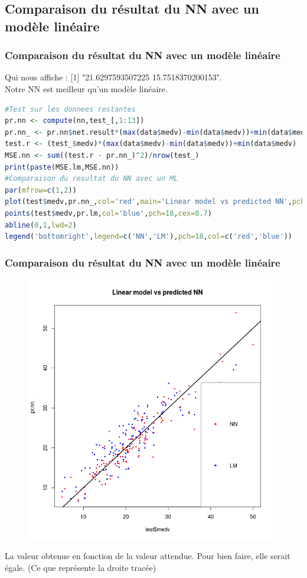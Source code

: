 \documentclass[compress]{beamer}
\begin{document}
\subsection{Comparaison du résultat du NN avec un modèle linéaire}
\begin{frame}[fragile]
	\frametitle{Comparaison du résultat du NN avec un modèle linéaire}
Qui nous affiche : [1] "21.6297593507225 15.7518370200153".\\
Notre NN est meilleur qu'un modèle linéaire.
\begin{lstlisting}[language=R]
#Test sur les donnees restantes
pr.nn <- compute(nn,test_[,1:13])
pr.nn_ <- pr.nn$net.result*(max(data$medv)-min(data$medv))+min(data$medv)
test.r <- (test_$medv)*(max(data$medv)-min(data$medv))+min(data$medv)
MSE.nn <- sum((test.r - pr.nn_)^2)/nrow(test_)
print(paste(MSE.lm,MSE.nn)) 
#Comparaison du resultat du NN avec un ML
par(mfrow=c(1,2))
plot(test$medv,pr.nn_,col='red',main='Linear model vs predicted NN',pch=18,cex=0.7)
points(test$medv,pr.lm,col='blue',pch=18,cex=0.7)
abline(0,1,lwd=2)
legend('bottomright',legend=c('NN','LM'),pch=18,col=c('red','blue'))
	\end{lstlisting}
\end{frame}


\begin{frame}
	\frametitle{Comparaison du résultat du NN avec un modèle linéaire}
		\begin{figure}
			\vspace{-7em}
			\includegraphics[width=\linewidth]{img/nn_lm}
		\end{figure}
		La valeur obtenue en fonction de la valeur attendue. Pour bien faire, elle serait égale. (Ce que représente la droite tracée)
\end{frame}
\end{document}
